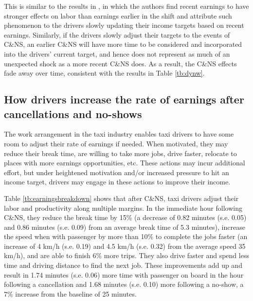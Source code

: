 \documentclass[reviewmode]{restat}
\begin{document}

This is similar to the results in \citet{thakral2018daily}, in which the authors find recent
earnings to have stronger effects on labor than earnings earlier in the shift%
 and attribute such phenomenon to the drivers slowly updating their income targets based on recent earnings.
Similarly, if the drivers slowly adjust their targets to the events of C\&NS, an earlier C\&NS will have
more time to be considered and incorporated into the drivers' current target, and hence does not represent
as much of an unexpected shock as a more recent C\&NS does. As a result, the C\&NS effects fade away over
time, consistent with the results in Table \ref{tb:dynw}.


\subsection{How drivers increase the rate of earnings after cancellations and no-shows}
The work arrangement in the taxi industry enables taxi drivers to have some room to adjust their rate of earnings if needed. When motivated, they may reduce their break time, are willing to take more jobs, drive faster, relocate to places with more earnings opportunities, etc. These actions may incur additional effort, but under heightened motivation and/or increased pressure to hit an income target, drivers may engage 
in these actions to improve their income.

Table \ref{tb:earningsbreakdown} shows that after C\&NS, taxi drivers adjust their labor and productivity along multiple margins. In the immediate hour following C\&NS, they reduce the break time by 15\% (a decrease of 0.82 minutes (s.e. 0.05) and 0.86 minutes (s.e. 0.09) from an average break time of 5.3 minutes), increase the speed when with passenger by more than 10\% to complete the jobs faster (an increase of 4 km/h (s.e. 0.19) and 4.5 km/h (s.e. 0.32) from the average speed 35 km/h), and are able to finish 6\% more trips. They also drive faster and spend less time and driving distance to find the next job. These improvements add up and result in 1.74 minutes (s.e. 0.06) more time with passenger on board in the hour following a cancellation and 1.68 minutes (s.e. 0.10) more following a no-show, a 7\% increase from the baseline of 25 minutes.  
\end{document}
